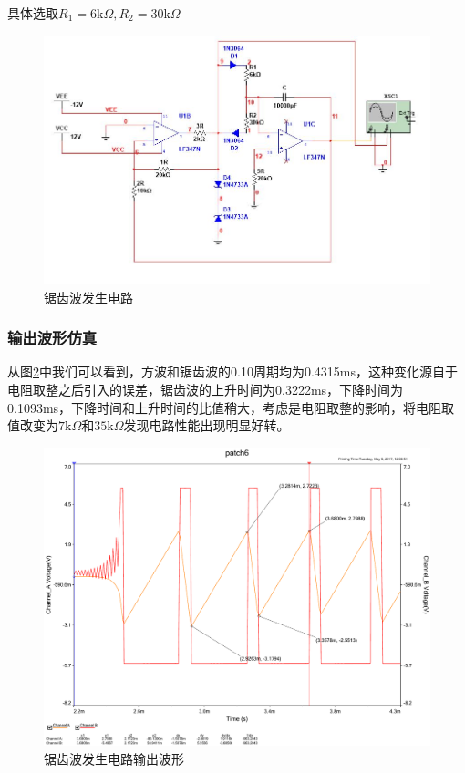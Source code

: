 \documentclass[UTF8,a4paper]{paper}
\begin{document}
具体选取$R_1=6\mathrm{k}\Omega,R_2=30\mathrm{k}\Omega$
\begin {figure}
\includegraphics [width=\textwidth]{tan.jpg}
\caption{锯齿波发生电路}
\label{tanCrit}
\end {figure}
\begin{multicols}{2}
\subsubsection{输出波形仿真}
从图\ref{tan}中我们可以看到，方波和锯齿波的0.10周期均为0.4315ms，这种变化源自于电阻取整之后引入的误差，锯齿波的上升时间为0.3222ms，下降时间为0.1093ms，下降时间和上升时间的比值稍大，考虑是电阻取整的影响，将电阻取值改变为$7\mathrm{k}\Omega$和$35\mathrm{k}\Omega$发现电路性能出现明显好转。
\begin{figure}[H]
\centering
\includegraphics[width=\columnwidth]{tan.pdf}
\caption{锯齿波发生电路输出波形}
\label{tan}
\end{figure}
\end{multicols}
\clearpage
\end{document}

